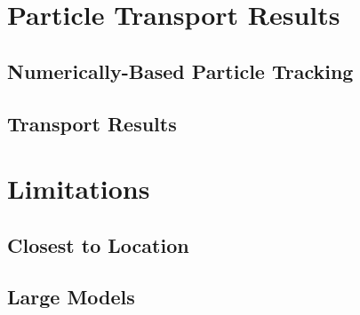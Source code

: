 \section{Particle Transport Results}


\subsection{Numerically-Based Particle Tracking}


\subsection{Transport Results}


\section{Limitations}

\subsection{Closest to Location}


\subsection{Large Models}

